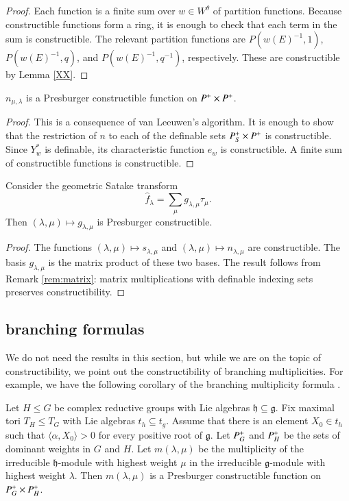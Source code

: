 \begin{proof} 
Each function is a finite sum over $w\in W^\theta$ of partition functions.  
Because constructible functions form a ring, it is enough to check that each term in the sum is
constructible.
The relevant partition functions
are $P(w(E)^{-1},1)$, $P(w(E)^{-1},q)$, and $P(w(E)^{-1},q^{-1})$, respectively.  These are constructible
by Lemma \ref{XX}.
\end{proof}



\begin{theorem}\label{lemma:van-leeuwen} $n_{\mu,\lambda}$ is a Presburger constructible function on $P^+\times P^+$.
\end{theorem}

\begin{proof} This is a consequence of van Leeuwen's algorithm. 
It is enough to show that the restriction of $n$ to each of the definable sets
$P^+_S\times P^+$ is constructible.  
Since $Y^*_w$ is definable, its characteristic function $e_w$ is constructible.
A finite sum of constructible functions is constructible.
\end{proof}


\begin{corollary} Consider the geometric Satake transform
\[
\hat f_\lambda = \sum_\mu g_{\lambda,\mu} \tau_\mu.
\]
Then $(\lambda,\mu)\mapsto g_{\lambda,\mu}$ is Presburger constructible.
\end{corollary}

\begin{proof}  The functions $(\lambda,\mu)\mapsto s_{\lambda,\mu}$ and $(\lambda,\mu)\mapsto n_{\lambda,\mu}$
are constructible.
The basis $g_{\lambda,\mu}$
is the matrix product of these two bases.  The result follows from Remark \ref{rem:matrix}:
matrix multiplications with definable indexing sets preserves constructibility.
\end{proof}

\subsection{branching formulas}

We do not need the results in this section, but while we are on the topic of constructibility,
we point out the constructibility of branching multiplicities.
For example, we have the following corollary of the branching
multiplicity formula \cite[Theorem ~8.2.1]{goodman}.

\begin{lemma} Let $H\le G$ be complex reductive groups with Lie algebras ${\mathfrak h}\subseteq {\mathfrak g}$.
Fix maximal tori $T_H\le T_G$ with Lie algebras $t_h\subseteq t_g$.  Assume that there is an element
$X_0\in t_h$ such that $\langle\alpha,X_0\rangle>0$ for every positive root of ${\mathfrak g}$.
Let $P^+_G$ and $P^+_H$ be the sets of dominant weights in $G$ and $H$.  Let $m(\lambda,\mu)$
be the multiplicity of the irreducible $\mathfrak h$-module with highest weight $\mu$ in the irreducible
$\mathfrak g$-module with highest weight $\lambda$.  Then $m(\lambda,\mu)$ is a Presburger constructible
function on $P^+_G\times P^+_H$.
\end{lemma}

